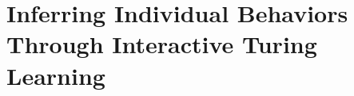 \documentclass[a4paper, twoside, 11pt]{scrbook}
\begin{document}

\frontmatter



\cleardoublepage


\cleardoublepage
{}


\cleardoublepage
{}


\cleardoublepage
\setcounter{tocdepth}{4}
\tableofcontents


\mainmatter

%
%
%
%
%
%
%

\chapter{Inferring Individual Behaviors Through Interactive Turing Learning}\label{ch:interaction}


%



\end{document}
